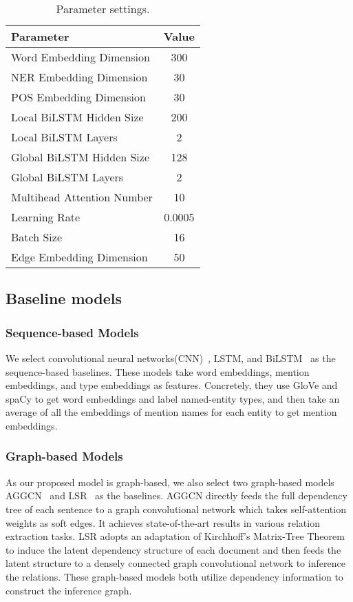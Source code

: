 \documentclass[letterpaper]{article} \usepackage{aaai21}  \usepackage{times}  \usepackage{helvet} \usepackage{courier}  \usepackage[hyphens]{url}  \usepackage{graphicx} \urlstyle{rm} \def\UrlFont{\rm}  \usepackage{natbib}  \usepackage{caption} \frenchspacing  \setlength{\pdfpagewidth}{8.5in}  \setlength{\pdfpageheight}{11in}
\begin{document}
\begin{table}[ht]
\centering
\begin{tabular}{l|c}
\toprule
 Parameter & Value \\
\midrule
Word Embedding Dimension & 300 \\
NER Embedding Dimension & 30 \\
POS Embedding Dimension & 30 \\
Local BiLSTM Hidden Size & 200 \\
Local BiLSTM Layers & 2 \\
Global BiLSTM Hidden Size & 128 \\
Global BiLSTM Layers & 2 \\
Multihead Attention Number & 10 \\
Learning Rate & 0.0005 \\
Batch Size & 16 \\
Edge Embedding Dimension & 50 \\
\bottomrule
\end{tabular}
\caption{Parameter settings.}
\label{tab:param_settings}
\end{table}



\subsection{Baseline models}
\subsubsection{Sequence-based Models}
We select convolutional neural networks(CNN)~\cite{zeng2014relation}, LSTM, and BiLSTM~\cite{cai2016bidirectional} as the sequence-based baselines. These models take word embeddings, mention embeddings, and type embeddings as features. Concretely, they use GloVe and spaCy to get word embeddings and label named-entity types, and then take an average of all the embeddings of mention names for each entity to get mention embeddings.

\subsubsection{Graph-based Models}
As our proposed model is graph-based, we also select two graph-based models AGGCN~\cite{guo2019attention} and LSR~\cite{nan2020reasoning} as the baselines. AGGCN directly feeds the full dependency tree of each sentence to a graph convolutional network which takes self-attention weights as soft edges. It achieves state-of-the-art results in various relation extraction tasks. LSR adopts an adaptation of Kirchhoff’s Matrix-Tree Theorem~\cite{tutte1984graph,koo2007structured} to induce the latent dependency structure of each document and then feeds the latent structure to a densely connected graph convolutional network to inference the relations. These graph-based models both utilize dependency information to construct the inference graph.
\end{document}
